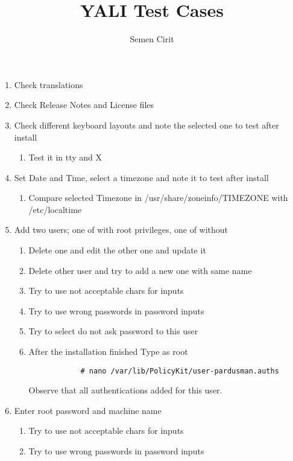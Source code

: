 \documentclass[a4paper,10pt]{article}
\title{YALI Test Cases}
\author{Semen Cirit}
\begin{document}
\maketitle
\begin{enumerate}
\item Check translations
\item Check Release Notes and License files
\item Check different keyboard layouts and note the selected one to test after install
    \begin{enumerate}
        \item Test it in tty and X
    \end{enumerate}
\item Set Date and Time, select a timezone and note it to test after install
    \begin{enumerate}
        \item Compare selected Timezone in /usr/share/zoneinfo/TIMEZONE with /etc/localtime
    \end{enumerate}
\item Add two users; one of with root privileges, one of without
    \begin{enumerate}
        \item Delete one and edit the other one and update it
        \item Delete other user and try to add a new one with same name
        \item Try to use not acceptable chars for inputs
        \item Try to use wrong passwords in password inputs
        \item Try to select do not ask password to this user
        \item After the installation finished
            Type as root
            \begin{verbatim}
            # nano /var/lib/PolicyKit/user-pardusman.auths
            \end{verbatim}
            Observe that all authentications added for this user.
    \end{enumerate}

\item Enter root password and machine name
    \begin{enumerate}
        \item Try to use not acceptable chars for inputs
        \item Try to use wrong passwords in password inputs
    \end{enumerate}


\end{enumerate}
\end{document}

